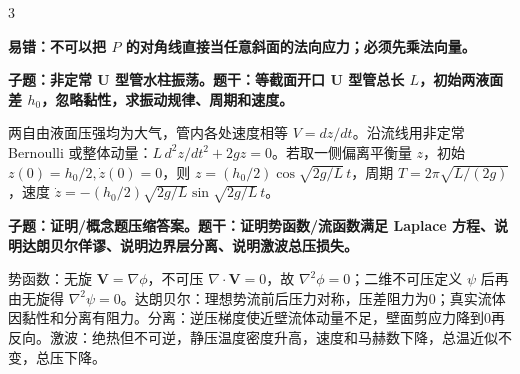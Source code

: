\documentclass[a4paper]{article}
\newcommand{\qt}[1]{\vspace{0.04pt}\colorbox{Q}{\parbox{\dimexpr\linewidth-2\fboxsep}{\color{white}\bfseries #1}}\par}
\newcommand{\ans}[1]{\colorbox{G}{\parbox{\dimexpr\linewidth-2\fboxsep}{#1}}\par}
\newcommand{\warn}[1]{\colorbox{Y}{\parbox{\dimexpr\linewidth-2\fboxsep}{\color{E}\bfseries #1}}\par}
\begin{document}
\begin{multicols}{3}
\warn{易错：不可以把 $P$ 的对角线直接当任意斜面的法向应力；必须先乘法向量。}
\qt{子题：非定常 U 型管水柱振荡。题干：等截面开口 U 型管总长 $L$，初始两液面差 $h_0$，忽略黏性，求振动规律、周期和速度。}
\ans{两自由液面压强均为大气，管内各处速度相等 $V=dz/dt$。沿流线用非定常 Bernoulli 或整体动量：$L\,d^2z/dt^2+2gz=0$。若取一侧偏离平衡量 $z$，初始 $z(0)=h_0/2,\dot z(0)=0$，则 $z=(h_0/2)\cos\sqrt{2g/L}\,t$，周期 $T=2\pi\sqrt{L/(2g)}$，速度 $\dot z=-(h_0/2)\sqrt{2g/L}\sin\sqrt{2g/L}\,t$。}
\qt{子题：证明/概念题压缩答案。题干：证明势函数/流函数满足 Laplace 方程、说明达朗贝尔佯谬、说明边界层分离、说明激波总压损失。}
\ans{势函数：无旋 $\bm V=\nabla\phi$，不可压 $\nabla\cdot\bm V=0$，故 $\nabla^2\phi=0$；二维不可压定义 $\psi$ 后再由无旋得 $\nabla^2\psi=0$。达朗贝尔：理想势流前后压力对称，压差阻力为0；真实流体因黏性和分离有阻力。分离：逆压梯度使近壁流体动量不足，壁面剪应力降到0再反向。激波：绝热但不可逆，静压温度密度升高，速度和马赫数下降，总温近似不变，总压下降。}


\end{multicols}
\end{document}
